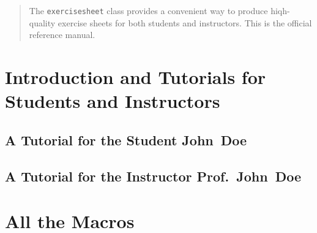 \documentclass{report}
\def\exercisesheet{\texttt{exercisesheet}}
\begin{document}

\begin{abstract}
  The \exercisesheet{} class provides a convenient way to produce
  hiqh-quality exercise sheets for both students and instructors. This
  is the official reference manual.
\end{abstract}

\tableofcontents

\chapter{Introduction and Tutorials for Students and Instructors}

\section{A Tutorial for the Student John~Doe}

\section{A Tutorial for the Instructor Prof.~John~Doe}

\chapter{All the Macros}
\end{document}
